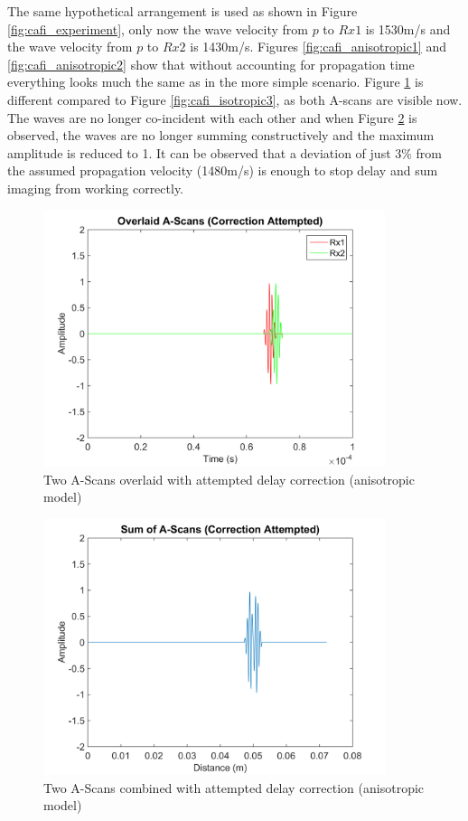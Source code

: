 The same hypothetical arrangement is used as shown in Figure \ref{fig:cafi_experiment}, only now the wave velocity from $p$ to $Rx1$ is 1530m/s and the wave velocity from $p$ to $Rx2$ is 1430m/s. Figures \ref{fig:cafi_anisotropic1} and \ref{fig:cafi_anisotropic2} show that without accounting for propagation time everything looks much the same as in the more simple scenario. Figure \ref{fig:cafi_anisotropic3} is different compared to Figure \ref{fig:cafi_isotropic3}, as both A-scans are visible now. The waves are no longer co-incident with each other and when Figure \ref{fig:cafi_anisotropic4} is observed, the waves are no longer summing constructively and the maximum amplitude is reduced to 1. It can be observed that a deviation of just 3\% from the assumed propagation velocity (1480m/s) is enough to stop delay and sum imaging from working correctly. 

\begin{figure}[htb]
\centering
		\includegraphics[width=100mm]{Anisotropic_3.png}
		\caption{Two A-Scans overlaid with attempted delay correction (anisotropic model)}
		\label{fig:cafi_anisotropic3}
\end{figure}

\begin{figure}[htb]
\centering
		\includegraphics[width=100mm]{Anisotropic_4.png}
		\caption{Two A-Scans combined with attempted delay correction (anisotropic model)}
		\label{fig:cafi_anisotropic4}
\end{figure}


